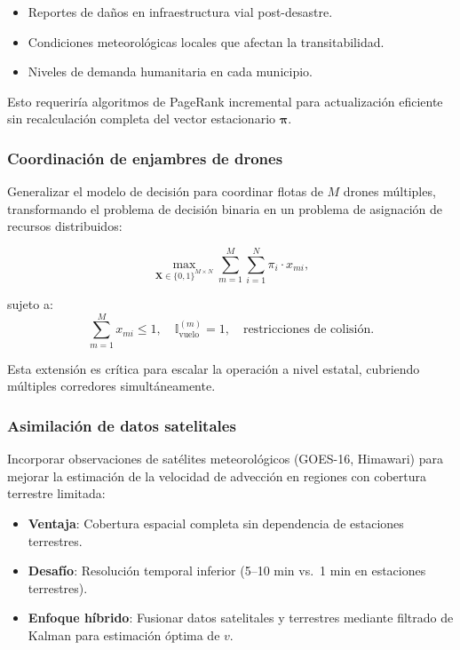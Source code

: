 \documentclass[
  spanish,
  us-letterpaper,
]{scrreprt}
\providecommand{\tightlist}{%
  \setlength{\itemsep}{0pt}\setlength{\parskip}{0pt}}
\numberwithin{equation}{section}
\begin{document}
\begin{itemize}
\tightlist
\item
  Reportes de daños en infraestructura vial post-desastre.
\item
  Condiciones meteorológicas locales que afectan la transitabilidad.
\item
  Niveles de demanda humanitaria en cada municipio.
\end{itemize}

Esto requeriría algoritmos de PageRank incremental para actualización
eficiente sin recalculación completa del vector estacionario
\(\boldsymbol{\pi}\).

\subsubsection*{Coordinación de enjambres de
drones}\label{coordinaciuxf3n-de-enjambres-de-drones}

Generalizar el modelo de decisión para coordinar flotas de \(M\) drones
múltiples, transformando el problema de decisión binaria en un problema
de asignación de recursos distribuidos:

\[
\max_{\mathbf{X} \in \{0,1\}^{M \times N}} \sum_{m=1}^{M} \sum_{i=1}^{N} \pi_i \cdot x_{mi},
\]

sujeto a: \[
\sum_{m=1}^{M} x_{mi} \leq 1, \quad \mathbb{I}_{\text{vuelo}}^{(m)} = 1, \quad \text{restricciones de colisión}.
\]

Esta extensión es crítica para escalar la operación a nivel estatal,
cubriendo múltiples corredores simultáneamente.

\subsubsection*{Asimilación de datos
satelitales}\label{asimilaciuxf3n-de-datos-satelitales}

Incorporar observaciones de satélites meteorológicos (GOES-16, Himawari)
para mejorar la estimación de la velocidad de advección en regiones con
cobertura terrestre limitada:

\begin{itemize}
\tightlist
\item
  \textbf{Ventaja}: Cobertura espacial completa sin dependencia de
  estaciones terrestres.
\item
  \textbf{Desafío}: Resolución temporal inferior (5--10 min vs.~1 min en
  estaciones terrestres).
\item
  \textbf{Enfoque híbrido}: Fusionar datos satelitales y terrestres
  mediante filtrado de Kalman para estimación óptima de \(v\).
\end{itemize}
\end{document}
